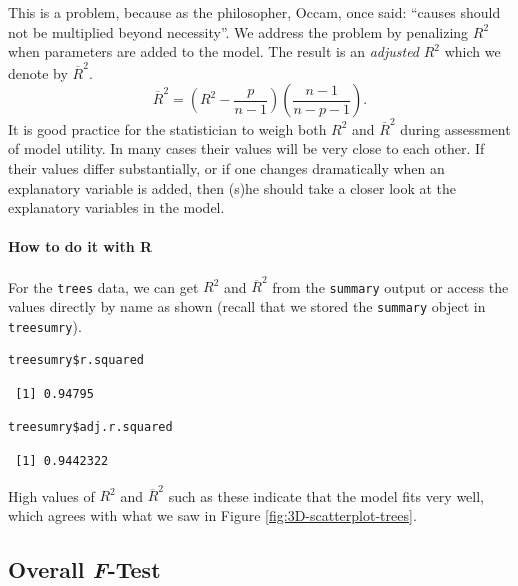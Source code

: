 \documentclass[captions=tableheading]{scrbook}
\begin{document}
This is a problem, because as the philosopher, Occam, once said: ``causes should not be multiplied beyond necessity''. We address the problem by penalizing $R^{2}$ when parameters are added to the model. The result is an \emph{adjusted} $R^{2}$ which we denote by $\overline{R}^{2}$.
\begin{equation}
\overline{R}^{2}=\left(R^{2}-\frac{p}{n-1}\right)\left(\frac{n-1}{n-p-1}\right).
\end{equation}
It is good practice for the statistician to weigh both $R^{2}$ and $\overline{R}^{2}$ during assessment of model utility. In many cases their values will be very close to each other. If their values differ substantially, or if one changes dramatically when an explanatory variable is added, then (s)he should take a closer look at the explanatory variables in the model.

\paragraph*{How to do it with \textsf{R}}
For the \texttt{trees} data, we can get $R^{2}$ and $\overline{R}^{2}$ from the \texttt{summary} output or access the values directly by name as shown (recall that we stored the \texttt{summary} object in \texttt{treesumry}).


\begin{verbatim}
treesumry$r.squared
\end{verbatim}

\begin{verbatim}
 [1] 0.94795
\end{verbatim}


\begin{verbatim}
treesumry$adj.r.squared
\end{verbatim}

\begin{verbatim}
 [1] 0.9442322
\end{verbatim}

High values of \(R^{2}\) and \( \overline{R}^2 \) such as these indicate that the model fits very well, which agrees with what we saw in Figure \ref{fig:3D-scatterplot-trees}.
\subsection{Overall \emph{F}-Test}
\label{sec-1-3-2}

\label{sub:mlr-Overall-F-Test}
\end{document}
